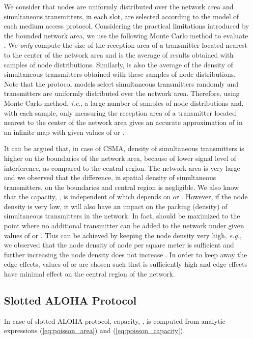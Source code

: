 \documentclass[12pt,english]{article}
\begin{document}
We consider that nodes are uniformly distributed over the network area and simultaneous transmitters, in each slot, are selected according to the model of each medium access protocol. Considering the practical limitations introduced by the bounded network area, we use the following Monte Carlo method to evaluate . We {\em only} compute the size of the reception area of a transmitter located nearest to the center of the network area and  is the average of results obtained with  samples of node distributions. Similarly,  is also the average of the density of simultaneous transmitters obtained with these  samples of node distributions. Note that the protocol models select simultaneous transmitters randomly and transmitters are uniformly distributed over the network area. Therefore, using Monte Carlo method, {\it i.e.}, a large number of samples of node distributions and, with each sample, only measuring the reception area of a transmitter located nearest to the center of the network area gives an accurate approximation of  in an infinite map with given values of  or . 

It can be argued that, in case of CSMA, density of simultaneous transmitters is higher on the boundaries of the network area, because of lower signal level of interference, as compared to the central region. The network area is very large and we observed that the difference, in spatial density of simultaneous transmitters, on the boundaries and central region is negligible. We also know that the capacity, , is independent of  which depends on  or . However, if the node density is very low, it will also have an impact on the packing (density) of simultaneous transmitters in the network. In fact,  should be maximized to the point where no additional transmitter can be added to the network under given values of  or . This can be achieved by keeping the node density very high, {\it e.g.}, we observed that the node density of  node per square meter is sufficient and further increasing the node density does not increase . In order to keep away the edge effects, values of  or  are chosen such that  is sufficiently high and edge effects have minimal effect on the central region of the network.

\subsection{Slotted ALOHA Protocol}

In case of slotted ALOHA protocol, capacity, , is computed from analytic expressions (\ref{eq:poisson_area}) and (\ref{eq:poisson_capacity}).
\end{document}
